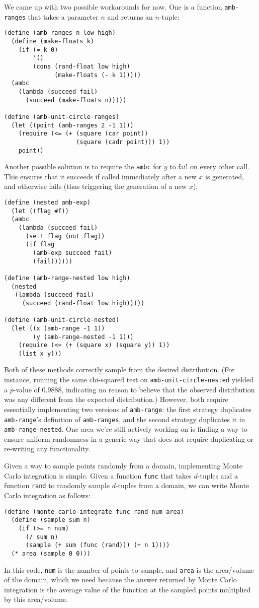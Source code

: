 \documentclass{article}
\begin{document}
We came up with two possible workarounds for now. One is a function
\texttt{amb-ranges} that takes a parameter $n$ and returns an $n$-tuple:
\begin{lstlisting}
(define (amb-ranges n low high)
  (define (make-floats k)
    (if (= k 0)
        '()
        (cons (rand-float low high)
              (make-floats (- k 1)))))
  (ambc
    (lambda (succeed fail)
      (succeed (make-floats n)))))

(define (amb-unit-circle-ranges)
  (let ((point (amb-ranges 2 -1 1)))
    (require (<= (+ (square (car point))
                    (square (cadr point))) 1))
    point))
\end{lstlisting}

Another possible solution is to require the \texttt{ambc} for $y$ to fail on
every other call. This ensures that it succeeds if called immediately after a
new $x$ is generated, and otherwise fails (thus triggering the generation of a
new $x$).
\begin{lstlisting}
(define (nested amb-exp)
  (let ((flag #f))
  (ambc
    (lambda (succeed fail)
      (set! flag (not flag))
      (if flag
        (amb-exp succeed fail)
        (fail))))))

(define (amb-range-nested low high)
  (nested
   (lambda (succeed fail)
     (succeed (rand-float low high)))))

(define (amb-unit-circle-nested)
  (let ((x (amb-range -1 1))
        (y (amb-range-nested -1 1)))
    (require (<= (+ (square x) (square y)) 1))
    (list x y)))
\end{lstlisting}

Both of these methods correctly sample from the desired
distribution. (For instance, running the same chi-squared test on
\texttt{amb-unit-circle-nested} yielded a $p$-value of 0.9888,
indicating no reason to believe that the observed distribution was any
different from the expected distribution.)  However, both require
essentially implementing two versions of \texttt{amb-range}: the first
strategy duplicates \texttt{amb-range}'s definition of
\texttt{amb-ranges}, and the second strategy duplicates it in
\texttt{amb-range-nested}. One area we're still actively working on is
finding a way to ensure uniform randomness in a generic way that does
not require duplicating or re-writing any functionality.

Given a way to sample points randomly from a domain, implementing
Monte Carlo integration is simple. Given a function \texttt{func} that
takes $d$-tuples and a function \texttt{rand} to randomly sample
$d$-tuples from a domain, we can write Monte Carlo integration as
follows:
\begin{lstlisting}
(define (monte-carlo-integrate func rand num area)
  (define (sample sum n)
    (if (>= n num)
      (/ sum n)
      (sample (+ sum (func (rand))) (+ n 1))))
  (* area (sample 0 0)))
\end{lstlisting}
In this code, \texttt{num} is the number of points to sample, and
\texttt{area} is the area/volume of the domain, which we need because
the answer returned by Monte Carlo integration is the average value of
the function at the sampled points multiplied by this area/volume.
\end{document}
